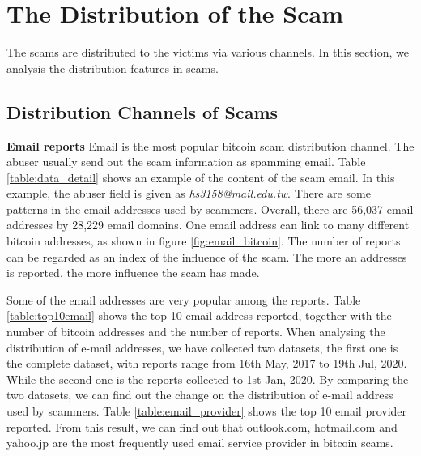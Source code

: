 
\section{The Distribution of the Scam}
\label{sec:characteristics}


The scams are distributed to the victims via various channels. In this section, we analysis the distribution features in scams.



\subsection{Distribution Channels of Scams}
 
\textbf{Email reports} Email is the most popular bitcoin scam distribution channel. The abuser usually send out the scam information as spamming email.  Table \ref{table:data_detail} shows an example of the content of the scam email. In this example, the abuser field is given as \textit{hs3158@mail.edu.tw}. There are some patterns in the email addresses used by scammers. Overall, there are 56,037 email addresses by 28,229 email domains. One email address can link to many different bitcoin addresses, as shown in figure \ref{fig:email_bitcoin}. The number of reports can be regarded as an index of the influence of the scam. The more an addresses is reported, the more influence the scam has made.

Some of the email addresses are very popular among the reports. Table \ref{table:top10email} shows the top 10 email address reported, together with the number of bitcoin addresses and the number of reports. When analysing the distribution of e-mail addresses, we have collected two datasets, the first one is the complete dataset, with reports range from 16th May, 2017 to 19th Jul, 2020. While the second one is the reports collected to 1st Jan, 2020. By comparing the two datasets, we can find out the change on the distribution of e-mail address used by scammers. Table \ref{table:email_provider} shows the top 10 email provider reported. From this result, we can find out that outlook.com, hotmail.com and yahoo.jp are the most frequently used email service provider in bitcoin scams.



